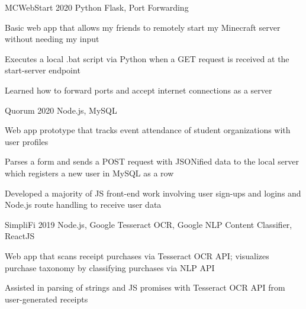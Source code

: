
\begin{cvprojects}

  \cvproject
  {MCWebStart} %
  {\href{https://github.com/KevinIsMyName/MCWebStart}{\faGithubSquare\acvHeaderIconSep\@KevinIsMyName}} %
  {2020} %
  {Python Flask, Port Forwarding} %
  {
    \begin{cvitems}
      \item {Basic web app that allows my friends to remotely start my Minecraft server without needing my input}
      \item {Executes a local .bat script via Python when a GET request is received at the start-server endpoint}
      \item {Learned how to forward ports and accept internet connections as a server}
    \end{cvitems}
  }

  \cvproject
  {Quorum}
  {\href{https://github.com/KevinIsMyName/Quorum}{\faGithubSquare\acvHeaderIconSep\@KevinIsMyName}}
  {2020}
  {Node.js, MySQL}
  {
    \begin{cvitems}
      \item {Web app prototype that tracks event attendance of student organizations with user profiles}
      \item {Parses a form and sends a POST request with JSONified data to the local server which registers a new user in MySQL as a row}
      \item {Developed a majority of JS front-end work involving user sign-ups and logins and Node.js route handling to receive user data}
    \end{cvitems}
  }

  \cvproject
  {SimpliFi}
  {\href{https://github.com/unitehenry/simply-finance}{\faGithubSquare\acvHeaderIconSep{}}}
  {2019}
  {Node.js, Google Tesseract OCR, Google NLP Content Classifier, ReactJS}
  {
    \begin{cvitems}
      \item {Web app that scans receipt purchases via Tesseract OCR API; visualizes purchase taxonomy by classifying purchases via NLP API}
      \item {Assisted in parsing of strings and JS promises with Tesseract OCR API from user-generated receipts}
    \end{cvitems}
  }


\end{cvprojects}
